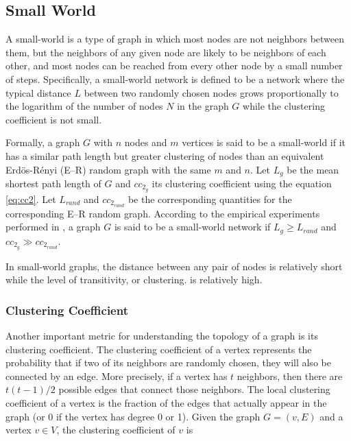 \subsection{\hspace*{3pt} Small World}

A small-world is a type of graph in which most nodes are not neighbors between them, but the neighbors of any given node are likely to be neighbors of each other, and most nodes can be reached from every other node by a small number of steps. Specifically, a small-world network is defined to be a network where the typical distance $L$ between two randomly chosen nodes grows proportionally to the logarithm of the number of nodes $N$ in the graph $G$ while the clustering coefficient is not small.

Formally, a graph $G$ with $n$ nodes and $m$ vertices is said to be a small-world if it has a similar path length but greater clustering of nodes than an equivalent Erdös-Rényi (E–R) random graph with the same $m$ and $n$. Let $L_g$ be the mean shortest path length of $G$ and $cc_{2_g}$ its clustering coefficient using the equation \ref{eq:cc2}. Let $L_{rand}$ and  $cc_{2_{rand}}$ be the corresponding quantities for the corresponding E–R random graph. According to the empirical experiments performed in \cite{watts1998collective}, a graph $G$ is said to be a small-world network if $L_g \ge L_{rand}$ and $ cc_{2_g} \gg cc_{2_{rand}}$.

In small-world graphs, the distance between any pair of nodes is relatively short while the level of transitivity, or clustering. is relatively high.



\subsubsection{\hspace*{3pt} Clustering Coefficient}

Another important metric for understanding the topology of a graph is its clustering coefficient. The clustering coefficient of a vertex represents the probability that if two of its neighbors are randomly chosen, they will also be connected by an edge. More precisely, if a vertex has $t$ neighbors, then there are $t(t-1)/2$ possible edges that connect those neighbors. The local clustering coefficient of a vertex is the fraction of the edges that actually appear in the graph (or 0 if the vertex has degree 0 or 1). Given the graph $G= (v,E)$ and a vertex $v \in V$, the clustering coefficient of $v$ is 

